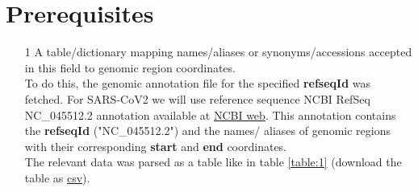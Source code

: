 \documentclass[a4paper, 10pt]{article}        %
\begin{document}
\section{Prerequisites} 
\begin{itemize}

\item[1] A table/dictionary mapping names/aliases or synonyms/accessions accepted in this field to genomic region coordinates. \\
To do this, the genomic annotation file for the specified \textbf{refseqId} was fetched. For SARS-CoV2 we will use reference sequence NCBI RefSeq NC\_045512.2 annotation available at \href{https://www.ncbi.nlm.nih.gov/nuccore/NC\_045512.2?report=gbwithparts&log$=seqview}{NCBI web}.
This annotation contains the \textbf{refseqId} ("NC\_045512.2") and the names/ aliases of genomic regions with their corresponding \textbf{start} and \textbf{end} coordinates. \\
The relevant data was parsed as a table like in table \ref{table:1} (download the table as \href{https://github.com/clauw87/virusbeacon/blob/raw_ideas/annot_coord_table.txt}{csv}).
\end{itemize}







\end{document}

